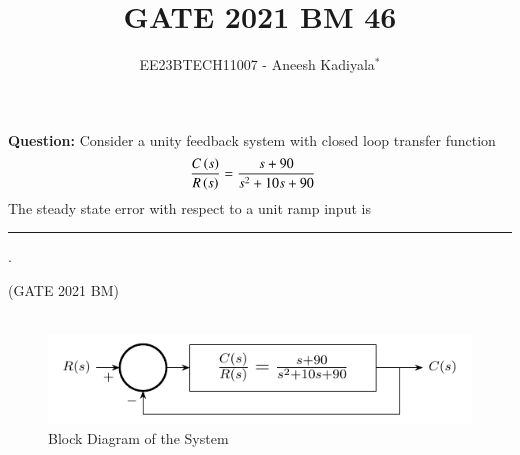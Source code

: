 \documentclass[journal,12pt,twocolumn]{IEEEtran}
\theoremstyle{remark}
\begin{document}

\vspace{3cm}

\title{GATE 2021 BM 46}
\author{EE23BTECH11007 - Aneesh Kadiyala$^{*}$%
}
\maketitle
\newpage
\bigskip

\renewcommand{\thefigure}{\theenumi}
\renewcommand{\thetable}{\theenumi}

\vspace{3cm}
\textbf{Question:} Consider a unity feedback system with closed loop transfer function
\begin{align*}
\frac{C\left(s\right)}{R\left(s\right)} &= \frac{s + 90}{s^2 + 10s + 90}
\end{align*}
The steady state error with respect to a unit ramp input is \rule{1cm}{0.15mm} . 

\hfill(GATE 2021 BM)
\\
\solution
\\
\begin{figure}[h!]
\centering
\includegraphics[width=\columnwidth]{figs/block-diagram.pdf}
\caption{Block Diagram of the System}
\label{fig:2021bm46-1}
\end{figure}
\end{document}
